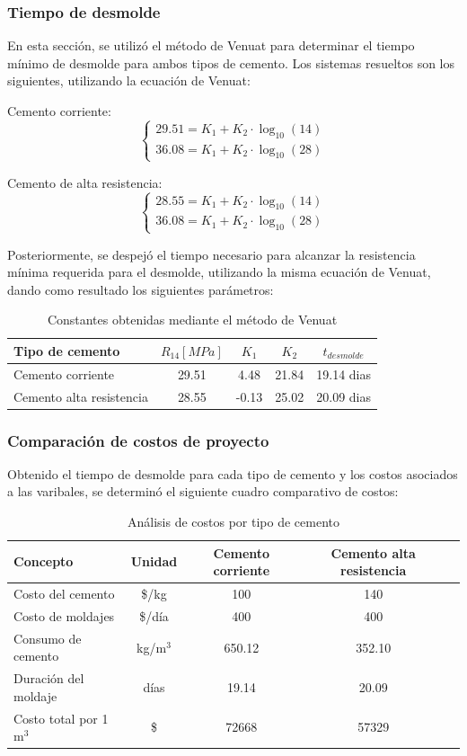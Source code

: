 \subsubsection*{Tiempo de desmolde}

En esta sección, se utilizó el método de Venuat para determinar el tiempo mínimo de desmolde para ambos tipos de cemento. Los sistemas resueltos son los siguientes, utilizando la ecuación de Venuat:

Cemento corriente:
\[
\begin{cases}
29.51 = K_1 + K_2 \cdot \log_{10}(14) \\
36.08 = K_1 + K_2 \cdot \log_{10}(28)
\end{cases}
\]

Cemento de alta resistencia:
\[
\begin{cases}
28.55 = K_1 + K_2 \cdot \log_{10}(14) \\
36.08 = K_1 + K_2 \cdot \log_{10}(28)
\end{cases}
\]

Posteriormente, se despejó el tiempo necesario para alcanzar la resistencia mínima requerida para el desmolde, utilizando la misma ecuación de Venuat, dando como resultado los siguientes parámetros:

\begin{table}[H]
\centering
\caption{Constantes obtenidas mediante el método de Venuat}
\renewcommand{\arraystretch}{1.15}
\small
\begin{tabular}{lcccc}
\hline
Tipo de cemento & $R_{14} [MPa]$ & $K_1$ & $K_2$ & $t_{desmolde}$ \\ \hline
Cemento corriente & 29.51 & 4.48 & 21.84 & 19.14 dias \\
Cemento alta resistencia & 28.55 & -0.13 & 25.02 & 20.09 dias\\ \hline
\end{tabular}
\end{table}

\subsubsection*{Comparación de costos de proyecto}

Obtenido el tiempo de desmolde para cada tipo de cemento y los costos asociados a las varibales, se determinó el siguiente cuadro comparativo de costos:

\begin{table}[H]
\centering
\caption{Análisis de costos por tipo de cemento}
\renewcommand{\arraystretch}{1.1}
\small
\begin{tabular}{lcccc}
\hline
Concepto & Unidad & Cemento corriente & Cemento alta resistencia \\ \hline
Costo del cemento & \$/kg & 100 & 140 \\
Costo de moldajes & \$/día & 400 & 400 \\
Consumo de cemento & kg/m$^3$ & 650.12 & 352.10 \\
Duración del moldaje & días & 19.14 & 20.09 \\
Costo total por 1 m$^3$ & \$ & 72668 & 57329 \\ \hline
\end{tabular}
\end{table}

